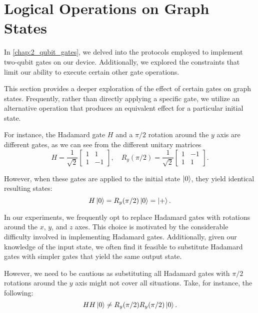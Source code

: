 \section{Logical Operations on Graph States}
\label{Sec:log_operation_graph}

In \cref{chap:2_qubit_gates}, we delved into the protocols employed to implement two-qubit gates on our device.
Additionally, we explored the constraints that limit our ability to execute certain other gate operations.

This section provides a deeper exploration of the effect of certain gates on graph states. 
Frequently, rather than directly applying a specific gate, we utilize an alternative operation that produces an equivalent effect for a particular initial state.

For instance, the Hadamard gate $H$ and a $\pi / 2$ rotation around the $y$ axis are different gates, as we can see from the different unitary matrices
\begin{equation}
    H = \frac{1}{\sqrt{2}}
    \begin{bmatrix}
        1 & 1 \\
        1 & -1
    \end{bmatrix} , \quad
    R_y(\pi / 2) = \frac{1}{\sqrt{2}}
    \begin{bmatrix}
        1 & -1 \\
        1 & 1
    \end{bmatrix} .
\end{equation}

However, when these gates are applied to the initial state $\ket{0}$, they yield identical resulting states:
\begin{equation}
    H \ket{0} = R_y(\pi/2) \ket{0} = \ket{+} .
\end{equation}

In our experiments, we frequently opt to replace Hadamard gates with rotations around the $x$, $y$, and $z$ axes. 
This choice is motivated by the considerable difficulty involved in implementing Hadamard gates.
Additionally, given our knowledge of the input state, we often find it feasible to substitute Hadamard gates with simpler gates that yield the same output state.

However, we need to be cautious as substituting all Hadamard gates with $\pi / 2$ rotations around the $y$ axis might not cover all situations. 
Take, for instance, the following:
\begin{equation}
    H H \ket{0} \neq
    R_y(\pi / 2) R_y(\pi / 2) \ket{0} .
\end{equation}

